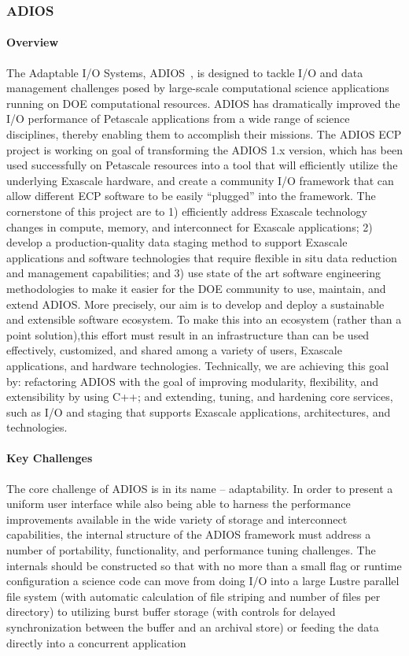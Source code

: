 \subsubsection{ ADIOS} 
\paragraph{Overview} 
The Adaptable I/O Systems, ADIOS~\cite{liu2014hello}, is designed to tackle I/O and data management challenges posed  by  large-scale computational science applications running on DOE computational resources. ADIOS has  dramatically  improved  the I/O performance of Petascale  applications from a   wide range of science disciplines, thereby enabling them to accomplish their missions. The ADIOS ECP project is working on goal of transforming the ADIOS 1.x version, which has been used successfully on Petascale resources into a tool that will efficiently utilize  the underlying Exascale hardware, and create a   community I/O framework that can allow different ECP software to be easily  “plugged” into the framework. The cornerstone of this project are to 1) efficiently  address Exascale technology changes in compute, memory, and interconnect for Exascale applications; 2) develop  a  production-quality data staging method to support Exascale applications and software  technologies that require flexible in situ data reduction and management capabilities; and 3) use state  of the  art software engineering methodologies to    make it   easier for the DOE community to    use, maintain, and extend ADIOS. More precisely, our aim is to    develop and deploy a   sustainable and extensible software ecosystem. To make this into an ecosystem (rather than a point solution),this effort must result in  an  infrastructure than can be used effectively, customized, and shared among a   variety of users, Exascale applications, and hardware technologies. Technically, we are achieving  this goal  by: refactoring ADIOS  with the  goal  of improving modularity, flexibility, and extensibility by using C++; and extending, tuning, and hardening core services, such as I/O and staging that supports Exascale applications, architectures, and technologies.

\paragraph{Key  Challenges}
The core challenge of ADIOS is in its name -- adaptability.  In order to present a uniform user interface while also being able to harness the performance improvements available in the wide variety of storage and interconnect capabilities, the internal structure of the ADIOS framework must address a number of portability, functionality, and performance tuning challenges.  The internals should be constructed so that with no more than a small flag or runtime configuration a science code can move from doing I/O into a large Lustre parallel file system (with automatic calculation of file striping and number of files per directory) to utilizing burst buffer storage (with controls for delayed synchronization between the buffer and an archival store) or feeding the data directly into a concurrent application   

